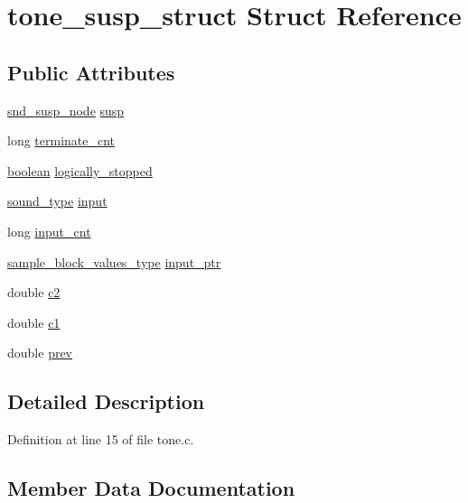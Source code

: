 \hypertarget{structtone__susp__struct}{}\section{tone\+\_\+susp\+\_\+struct Struct Reference}
\label{structtone__susp__struct}
\subsection*{Public Attributes}
\begin{DoxyCompactItemize}
\item 
\hyperlink{sound_8h_a6b268203688a934bd798ceb55f85d4c0}{snd\+\_\+susp\+\_\+node} \hyperlink{structtone__susp__struct_ad2cdf231f57ce21c2645cbc153de0921}{susp}
\item 
long \hyperlink{structtone__susp__struct_a190064881536c16a25675f2f42bcbd92}{terminate\+\_\+cnt}
\item 
\hyperlink{cext_8h_a7670a4e8a07d9ebb00411948b0bbf86d}{boolean} \hyperlink{structtone__susp__struct_a91fe73754ae328c00cb40a9e335bb187}{logically\+\_\+stopped}
\item 
\hyperlink{sound_8h_a792cec4ed9d6d636d342d9365ba265ea}{sound\+\_\+type} \hyperlink{structtone__susp__struct_a7db6f4f59673a34d12848bf704c7718a}{input}
\item 
long \hyperlink{structtone__susp__struct_a54e97a7efc43c1f7c2b63f0669950c11}{input\+\_\+cnt}
\item 
\hyperlink{sound_8h_a83d17f7b465d1591f27cd28fc5eb8a03}{sample\+\_\+block\+\_\+values\+\_\+type} \hyperlink{structtone__susp__struct_a40a79c1ab23136bc0dfec291dde905da}{input\+\_\+ptr}
\item 
double \hyperlink{structtone__susp__struct_ae7917c4bc157cf5f94cd31950ece592a}{c2}
\item 
double \hyperlink{structtone__susp__struct_aa1dad4f3359dc279d36a1c4865ec37fa}{c1}
\item 
double \hyperlink{structtone__susp__struct_a9e6938eb08597f722e2571ae223ae636}{prev}
\end{DoxyCompactItemize}


\subsection{Detailed Description}


Definition at line 15 of file tone.\+c.



\subsection{Member Data Documentation}
